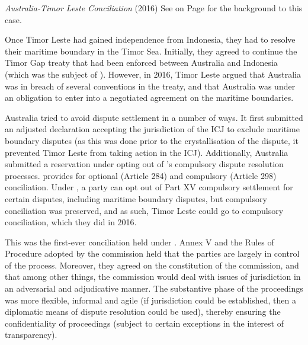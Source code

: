 \begin{casedetails}{\textit{Australia-Timor Leste Conciliation} (2016)}
    \flushleft
    See  on Page \pageref{case:Horta v Commonwealth} for the background to this case.

    \vspace{\baselineskip}

    Once Timor Leste had gained independence from Indonesia, they had to resolve their maritime boundary in the Timor Sea. Initially, they agreed to continue the Timor Gap treaty that had been enforced between Australia and Indonesia (which was the subject of ). However, in 2016, Timor Leste argued that Australia was in breach of several conventions in the treaty, and that Australia was under an obligation to enter into a negotiated agreement on the maritime boundaries.

    \vspace{\baselineskip}

    Australia tried to avoid dispute settlement in a number of ways. It first submitted an adjusted declaration accepting the jurisdiction of the ICJ to exclude maritime boundary disputes (as this was done prior to the crystallisation of the dispute, it prevented Timor Leste from taking action in the ICJ). Additionally, Australia submitted a reservation under  opting out of 's compulsory dispute resolution processes.  provides for optional (Article 284) and compulsory (Article 298) conciliation. Under , a party can opt out of Part XV compulsory settlement for certain disputes, including maritime boundary disputes, but compulsory conciliation was preserved, and as such, Timor Leste could go to compulsory conciliation, which they did in 2016.

    \vspace{\baselineskip}

    This was the first-ever conciliation held under . Annex V and the Rules of Procedure adopted by the commission held that the parties are largely in control of the process. Moreover, they agreed on the constitution of the commission, and that among other things, the commission would deal with issues of jurisdiction in an adversarial and adjudicative manner. The substantive phase of the proceedings was more flexible, informal and agile (if jurisdiction could be established, then a diplomatic means of dispute resolution could be used), thereby ensuring the confidentiality of proceedings (subject to certain exceptions in the interest of transparency).


\end{casedetails}
